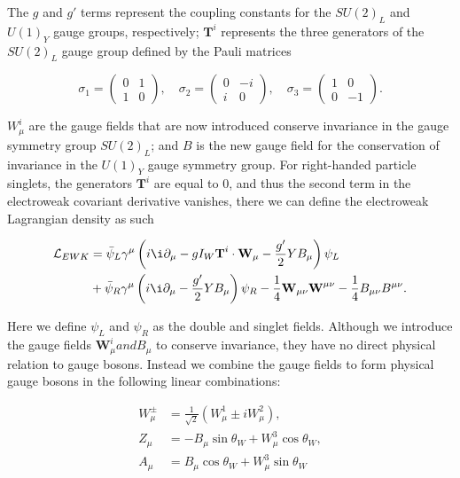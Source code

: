 The $g$ and $g'$ terms represent the coupling constants for the $SU(2)_L$ and $U(1)_Y$ gauge groups, respectively; $\textbf{T}^i$ represents the three generators of the $SU(2)_L$ gauge group defined by the Pauli matrices 

\begin{equation}
\sigma_1 = 
\begin{pmatrix}
0 & 1 \\
1 & 0
\end{pmatrix}
,
\quad
\sigma_2 =
\begin{pmatrix}
0 & -i \\
i & 0
\end{pmatrix}
,
\quad 
\sigma_3 = 
\begin{pmatrix}
1 & 0 \\
0 & -1
\end{pmatrix}. 
\end{equation}

$W^i_{\mu}$ are the gauge fields that are now introduced conserve invariance in the gauge symmetry group $SU(2)_L$; and $B$ is the new gauge field for the conservation of invariance in the $U(1)_Y$ gauge symmetry group. For right-handed particle singlets, the generators $\textbf{T}^i$ are equal to 0, and thus the second term in the electroweak covariant derivative vanishes, there we can define the electroweak Lagrangian density as such

\begin{equation}
\begin{split}
\lumi_{EWK} & = \bar{\psi}_L \gamma^{\mu} \left(i \i\partial_{\mu} - g I_W \textbf{T}^i \cdot \textbf{W}_{\mu} - \frac{g'}{2} Y B_{\mu}\right)\psi_L \\
& + \bar{\psi}_R \gamma^{\mu}\left(i \i\partial_{\mu} - \frac{g'}{2} Y B_{\mu}\right)\psi_R - \frac{1}{4}\textbf{W}_{\mu \nu}\textbf{W}^{\mu \nu} - \frac{1}{4} B_{\mu \nu} B^{\mu \nu} .
\end{split}
\end{equation}

Here we define $\psi_L$ and $\psi_R$ as the double and singlet fields. Although we introduce the gauge fields $\textbf{W}^i_{\mu} and B_{\mu}$ to conserve invariance, they have no direct physical relation to gauge bosons. Instead we combine the gauge fields to form physical gauge bosons in the following linear combinations:

\begin{align}
W^{\pm}_{\mu} & = \frac{1}{\sqrt{2}}(W^1_{\mu} \pm iW^2_{\mu}), \\
Z_{\mu} & = -B_{\mu}\sin\theta_W + W^3_{\mu}\cos\theta_W, \\
A_{\mu} & = B_{\mu}\cos\theta_W + W^3_{\mu}\sin\theta_W
\end{align}   

